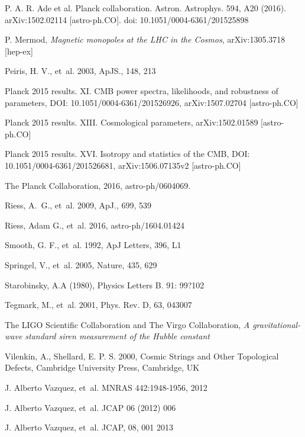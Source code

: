 \documentclass{rmaa}
\begin{document}
\begin{thebibliography}
P.  A.  R.  Ade  et  al.  Planck  collaboration.  Astron.  Astrophys. 594, A20 (2016). arXiv:1502.02114 [astro-ph.CO]. doi: 10.1051/0004-6361/201525898

P. Mermod, \textit{Magnetic monopoles at the LHC in the Cosmos}, arXiv:1305.3718 [hep-ex]

Peiris, H. V., et~al. 2003, ApJS., 148, 213  

Planck 2015 results. XI. CMB power spectra, likelihoods, and robustness of parameters,  	DOI: 10.1051/0004-6361/201526926, arXiv:1507.02704 [astro-ph.CO] 

Planck 2015 results. XIII. Cosmological parameters,  	arXiv:1502.01589 [astro-ph.CO]

 Planck 2015 results. XVI. Isotropy and statistics of the CMB, DOI:  	10.1051/0004-6361/201526681,  arXiv:1506.07135v2 [astro-ph.CO]
 
The Planck Collaboration, 2016, astro-ph/0604069. 
 
 Riess, A.~G., et~al. 2009, ApJ., 699, 539 

Riess, Adam G., et~al. 2016,  astro-ph/1604.01424

Smooth, G. F., et~al. 1992, ApJ Letters, 396, L1 
  
 Springel, V., et~al.  2005, Nature, 435, 629  

 Starobinsky, A.A (1980), Physics Letters B. 91: 99?102  

Tegmark, M., et~al. 2001, Phys. Rev. D, 63, 043007   

The LIGO Scientific Collaboration and The Virgo Collaboration, \textit{A gravitational-wave standard siren measurement of the Hubble constant}
 
 Vilenkin, A., Shellard, E. P. S. 2000, Cosmic Strings and Other Topological Defects,
Cambridge University Press,  Cambridge, UK 

 J. Alberto Vazquez, et~al. MNRAS 442:1948-1956, 2012

 J. Alberto Vazquez, et~al.  JCAP 06 (2012) 006

 J. Alberto Vazquez, et~al. JCAP, 08, 001 2013



\end{thebibliography}
\end{document}

